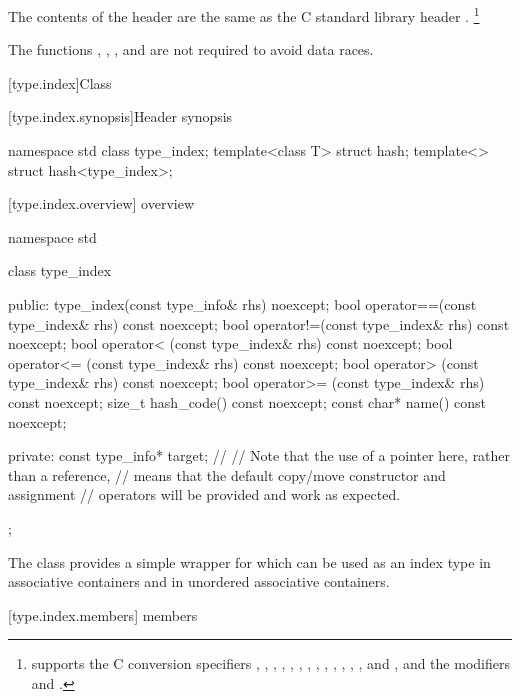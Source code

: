 \pnum
{}%
%
The contents of the header  are the same as the C standard library header .%
\footnote{ supports the C conversion specifiers
, , , , , , ,
, , , , , , and
, and the modifiers  and .}

\pnum
The functions , , , and
 are not required to avoid data
races.


[type.index]{Class }

[type.index.synopsis]{Header  synopsis}

%
\begin{codeblock}
namespace std {
  class type_index;
  template<class T> struct hash;
  template<> struct hash<type_index>;
}
\end{codeblock}

[type.index.overview]{ overview}

%
\begin{codeblock}
namespace std {
  class type_index {
  public:
    type_index(const type_info& rhs) noexcept;
    bool operator==(const type_index& rhs) const noexcept;
    bool operator!=(const type_index& rhs) const noexcept;
    bool operator< (const type_index& rhs) const noexcept;
    bool operator<= (const type_index& rhs) const noexcept;
    bool operator> (const type_index& rhs) const noexcept;
    bool operator>= (const type_index& rhs) const noexcept;
    size_t hash_code() const noexcept;
    const char* name() const noexcept;

  private:
    const type_info* target;    // \expos
    // Note that the use of a pointer here, rather than a reference,
    // means that the default copy/move constructor and assignment
    // operators will be provided and work as expected.
  };
}
\end{codeblock}

\pnum
The class  provides a simple wrapper for
 which can be used as an index type in associative
containers and in unordered associative
containers.

[type.index.members]{ members}

